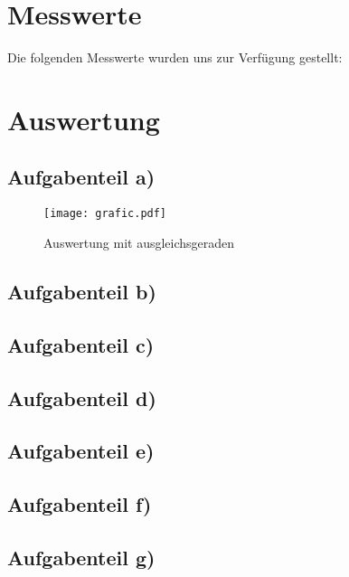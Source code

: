 \newpage
    \section{Messwerte}
    Die folgenden Messwerte wurden uns zur Verfügung gestellt:
    

    \newpage
    \section{Auswertung}
        \subsection{Aufgabenteil a)}
        \begin{figure}
               \centering
               \texttt{[image: grafic.pdf]}
               \caption{Auswertung mit ausgleichsgeraden}
               \label{fig:grafic}
        \end{figure}


            

        \subsection{Aufgabenteil b)}


        \subsection{Aufgabenteil c)}


        \subsection{Aufgabenteil d)}


        \subsection{Aufgabenteil e)}


        \subsection{Aufgabenteil f)}


        \subsection{Aufgabenteil g)}
